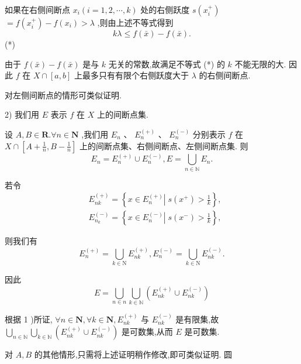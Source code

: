 如果在右侧间断点 ${x}_{i}\left( {i = 1,2,\cdots ,k}\right)$ 处的右侧跃度 $s\left( {x}_{i}^{ + }\right)$  $= f\left( {x}_{i}^{ + }\right)  - f\left( {x}_{i}\right)  > \lambda$ ,则由上述不等式得到
$${k\lambda } \leq  f\left( \bar{x}\right)  - f\left( \bar{x}\right) .$$
(*)

由于 $f\left( \bar{x}\right)  - f\left( \bar{x}\right)$ 是与 $k$ 无关的常数,故满足不等式 (*) 的 $k$ 不能无限的大. 因此 $f$ 在 $X \cap  \left\lbrack  {a,b}\right\rbrack$ 上最多只有有限个右侧跃度大于 $\lambda$ 的右侧间断点.

对左侧间断点的情形可类似证明.

2) 我们用 $E$ 表示 $f$ 在 $X$ 上的间断点集.

设 $A,B \in  \mathbf{R}.\forall n \in  \mathbf{N}$ ,我们用 ${E}_{n}\text{ 、 }{E}_{n}^{\left( +\right) }\text{ 、 }{E}_{n}^{\left( -\right) }$ 分别表示 $f$ 在 $X \cap  \left\lbrack  {A + \frac{1}{n},B - \frac{1}{n}}\right\rbrack$ 上的间断点集、右侧间断点、左侧间断点集. 则
$${E}_{n} = {E}_{n}^{\left( +\right) } \cup  {E}_{n}^{\left( -\right) },E = \mathop{\bigcup }\limits_{{n \in  \mathbb{N}}}{E}_{n}.$$

若令
\begin{align*}
	&{E}_{nk}^{\left( +\right) } = \left\{  {x \in  {E}_{n}^{\left( +\right) }\left| {\;s\left( {x}^{ + }\right)  > \frac{1}{k}}\right. }\right\}  ,\\
	&{E}_{{n}_{k}}^{\left( -\right) } = \left\{  {x \in  {E}_{n}^{\left( -\right) }\left| {\;s\left( {x}^{ - }\right)  > \frac{1}{k}}\right. }\right\}  ,
\end{align*}

则我们有
$${E}_{n}^{\left( +\right) } = \mathop{\bigcup }\limits_{{k \in  \mathrm{N}}}{E}_{nk}^{\left( +\right) },{E}_{n}^{\left( -\right) } = \mathop{\bigcup }\limits_{{k \in  \mathrm{N}}}{E}_{nk}^{\left( -\right) }.$$

因此
$$E = \mathop{\bigcup }\limits_{{n \in  n}}\mathop{\bigcup }\limits_{{k \in  \mathbb{N}}}\left( {{E}_{nk}^{\left( +\right) } \cup  {E}_{nk}^{\left( -\right) }}\right)$$

根据 1 )所证, $\forall n \in  \mathbf{N},\forall k \in  \mathbf{N},{E}_{nk}^{\left( +\right) }$ 与 ${E}_{nk}^{\left( -\right) }$ 是有限集,故 $\mathop{\bigcup }\limits_{{n \in  \mathbb{N}}}\mathop{\bigcup }\limits_{{k \in  \mathbb{N}}}\left( {{E}_{nk}^{\left( +\right) } \cup  {E}_{nk}^{\left( -\right) }}\right)$ 是可数集,从而 $E$ 是可数集.

对 $A,B$ 的其他情形,只需将上述证明稍作修改,即可类似证明. 圆

